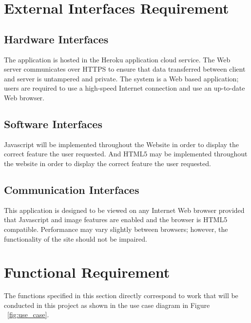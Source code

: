 
\section{External Interfaces Requirement}

\subsection{Hardware Interfaces}

The application is hosted in the Heroku application cloud service. The Web server communicates over HTTPS to ensure that data transferred between client and server is untampered and private. The system is a Web based application; users are required to use a high-speed Internet connection and use an up-to-date Web browser.

\subsection{Software Interfaces}

Javascript will be implemented throughout the Website in order to display the correct feature the user requested. And HTML5 may be implemented throughout the website in order to display the correct feature the user requested.

\subsection{Communication Interfaces}

This application is designed to be viewed on any Internet Web browser provided that Javascript and image features are enabled and the browser is HTML5 compatible. Performance may vary slightly between browsers; however, the functionality of the site should not be impaired.

\section{Functional Requirement}

The functions specified in this section directly correspond to work that will be conducted in this project as shown in the use case diagram in Figure ~\ref{fig:use_case}. 

